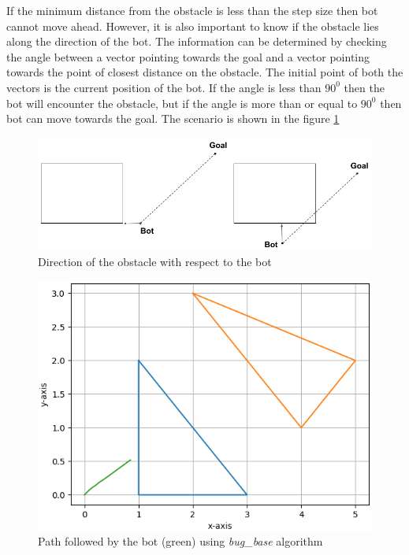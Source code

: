 \documentclass[a4paper, 11pt, letterpaper]{article}
\begin{document}
If the minimum distance from the obstacle is less than the step size then bot cannot move ahead. However, it is also important to know if the obstacle lies along the direction of the bot. The information can be determined by checking the angle between a vector pointing towards the goal and a vector pointing towards the point of closest distance on the obstacle. The initial point of both the vectors is the current position of the bot. If the angle is less than $90^0$ then the bot will encounter the obstacle, but if the angle is more than or equal to $90^0$ then bot can move towards the goal. The scenario is shown in the figure \ref{fig:obstacledirection}

\begin{figure}
	\centering
	\includegraphics[scale = 0.4]{obstacleDirection.png}
	\caption{\footnotesize{Direction of the obstacle with respect to the bot}}
	\label{fig:obstacledirection}
\end{figure}

\begin{figure}[tbhp!]
	\centering
	\includegraphics[scale = 0.5]{plots/bugBasePath.png}
	\caption{\footnotesize{Path followed by the bot (green) using \textit{bug\_base} algorithm}}
	\label{fig:bugbase}
\end{figure}
\end{document}
